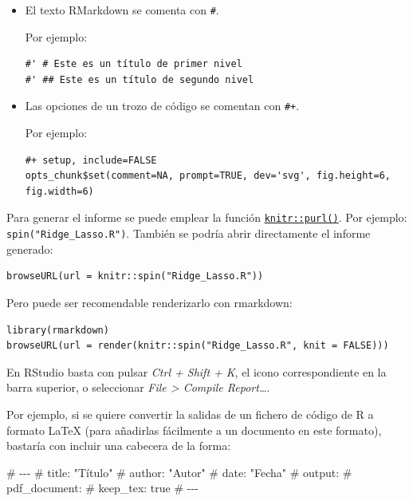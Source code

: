 \documentclass[
]{book}
\newenvironment{Shaded}{\begin{snugshade}}{\end{snugshade}}
\newcommand{\NormalTok}[1]{#1}
\theoremstyle{break}
\theoremstyle{nonumberplain}
\begin{document}
\begin{itemize}
\item
  El texto RMarkdown se comenta con \texttt{\#\textquotesingle{}}.

  Por ejemplo:

\begin{verbatim}
#' # Este es un título de primer nivel
#' ## Este es un título de segundo nivel
\end{verbatim}
\item
  Las opciones de un trozo de código se comentan con \texttt{\#+}.

  Por ejemplo:

\begin{verbatim}
#+ setup, include=FALSE
opts_chunk$set(comment=NA, prompt=TRUE, dev='svg', fig.height=6, fig.width=6)
\end{verbatim}
\end{itemize}

Para generar el informe se puede emplear la función \href{https://rdrr.io/pkg/knitr/man/knit.html}{\texttt{knitr::purl()}}.
Por ejemplo: \texttt{spin("Ridge\_Lasso.R")}.
También se podría abrir directamente el informe generado:

\begin{verbatim}
browseURL(url = knitr::spin("Ridge_Lasso.R"))
\end{verbatim}

Pero puede ser recomendable renderizarlo con rmarkdown:

\begin{verbatim}
library(rmarkdown)
browseURL(url = render(knitr::spin("Ridge_Lasso.R", knit = FALSE)))
\end{verbatim}

En RStudio basta con pulsar \emph{Ctrl + Shift + K}, el icono correspondiente en la barra superior, o seleccionar \emph{File \textgreater{} Compile Report\ldots{}}.

Por ejemplo, si se quiere convertir la salidas de un fichero de código de R a formato LaTeX
(para añadirlas fácilmente a un documento en este formato), bastaría con incluir una cabecera de
la forma:

\begin{Shaded}
\begin{Highlighting}[]
\NormalTok{\#\textquotesingle{} {-}{-}{-}}
\NormalTok{\#\textquotesingle{} title: "Título"}
\NormalTok{\#\textquotesingle{} author: "Autor"}
\NormalTok{\#\textquotesingle{} date: "Fecha"}
\NormalTok{\#\textquotesingle{} output:}
\NormalTok{\#\textquotesingle{}   pdf\_document:}
\NormalTok{\#\textquotesingle{}      keep\_tex: true}
\NormalTok{\#\textquotesingle{} {-}{-}{-}}
\end{Highlighting}
\end{Shaded}
\end{document}
